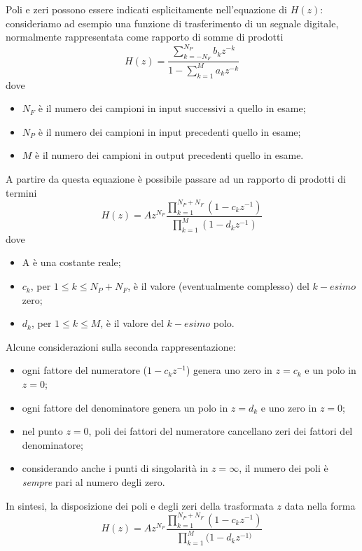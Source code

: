 Poli e zeri possono essere indicati esplicitamente nell'equazione di $H(z)$: consideriamo ad esempio una funzione di trasferimento di un segnale digitale, normalmente rappresentata come rapporto di somme di prodotti
\begin{displaymath}
H(z)=\frac{\sum_{k=-N_F}^{N_P} {b_k}z^{-k}} {1-\sum_{k=1}^Ma_kz^{-k}}
\end{displaymath}
dove 
\begin{itemize}
\item $N_F$ \`e il numero dei campioni in input successivi a quello in esame;
\item $N_P$ \`e il numero dei campioni in input precedenti quello in esame;
\item $M$  \`e il numero dei campioni in output precedenti quello in esame.
\end{itemize}
A partire da questa equazione \`e possibile passare ad un rapporto di prodotti di termini 
\begin{displaymath}
H(z)=Az^{N_F} \frac{\prod_{k=1}^{N_P+N_F}(1-c_k z^{-1})}{\prod_{k=1}^M (1-d_k z^{-1})}
\end{displaymath}
dove 
\begin{itemize}
\item A \`e una costante reale;
\item $c_k$, per $1\leq k \leq N_P + N_F$, \`e il valore (eventualmente complesso) del $k-esimo$ zero;
\item $d_k$, per $1\leq k \leq M$, \`e il valore del $k-esimo$ polo.
\end{itemize}
Alcune considerazioni sulla seconda rappresentazione:
\begin{itemize}
\item ogni fattore del numeratore ($1-c_kz^{-1}$) genera uno zero in $z=c_k$ e un polo in $z=0$;
\item ogni fattore del denominatore genera un polo in $z=d_k$ e uno zero in $z=0$;
\item nel punto $z=0$, poli dei fattori del numeratore cancellano zeri dei fattori del denominatore;
\item considerando anche i punti di singolarit\`a in $z=\infty$, il numero dei poli \`e \emph{sempre} pari al numero degli zero.
\end{itemize}
In sintesi, la disposizione dei poli e degli zeri della trasformata $z$ data nella forma 
\begin{displaymath}
H(z)=Az^{N_F} \frac{\prod_{k=1}^{N_P+N_F}(1-c_k z^{-1})}{\prod_{k=1}^M (1-d_k z^{-1)}}
\end{displaymath}
